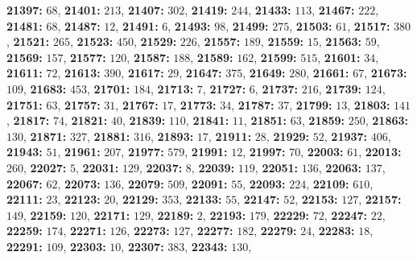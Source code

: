 \textsf{\bfseries 21397:} $68$, \textsf{\bfseries 21401:} $213$, \textsf{\bfseries 21407:} $302$, \textsf{\bfseries 21419:} $244$, \textsf{\bfseries 21433:} $113$, \textsf{\bfseries 21467:} $222$, \textsf{\bfseries 21481:} $68$, \textsf{\bfseries 21487:} $12$, \textsf{\bfseries 21491:} $6$, \textsf{\bfseries 21493:} $98$, \textsf{\bfseries 21499:} $275$, \textsf{\bfseries 21503:} $61$, \textsf{\bfseries 21517:} $380$, \textsf{\bfseries 21521:} $265$, \textsf{\bfseries 21523:} $450$, \textsf{\bfseries 21529:} $226$, \textsf{\bfseries 21557:} $189$, \textsf{\bfseries 21559:} $15$, \textsf{\bfseries 21563:} $59$, \textsf{\bfseries 21569:} $157$, \textsf{\bfseries 21577:} $120$, \textsf{\bfseries 21587:} $188$, \textsf{\bfseries 21589:} $162$, \textsf{\bfseries 21599:} $515$, \textsf{\bfseries 21601:} $34$, \textsf{\bfseries 21611:} $72$, \textsf{\bfseries 21613:} $390$, \textsf{\bfseries 21617:} $29$, \textsf{\bfseries 21647:} $375$, \textsf{\bfseries 21649:} $280$, \textsf{\bfseries 21661:} $67$, \textsf{\bfseries 21673:} $109$, \textsf{\bfseries 21683:} $453$, \textsf{\bfseries 21701:} $184$, \textsf{\bfseries 21713:} $7$, \textsf{\bfseries 21727:} $6$, \textsf{\bfseries 21737:} $216$, \textsf{\bfseries 21739:} $124$, \textsf{\bfseries 21751:} $63$, \textsf{\bfseries 21757:} $31$, \textsf{\bfseries 21767:} $17$, \textsf{\bfseries 21773:} $34$, \textsf{\bfseries 21787:} $37$, \textsf{\bfseries 21799:} $13$, \textsf{\bfseries 21803:} $141$, \textsf{\bfseries 21817:} $74$, \textsf{\bfseries 21821:} $40$, \textsf{\bfseries 21839:} $110$, \textsf{\bfseries 21841:} $11$, \textsf{\bfseries 21851:} $63$, \textsf{\bfseries 21859:} $250$, \textsf{\bfseries 21863:} $130$, \textsf{\bfseries 21871:} $327$, \textsf{\bfseries 21881:} $316$, \textsf{\bfseries 21893:} $17$, \textsf{\bfseries 21911:} $28$, \textsf{\bfseries 21929:} $52$, \textsf{\bfseries 21937:} $406$, \textsf{\bfseries 21943:} $51$, \textsf{\bfseries 21961:} $207$, \textsf{\bfseries 21977:} $579$, \textsf{\bfseries 21991:} $12$, \textsf{\bfseries 21997:} $70$, \textsf{\bfseries 22003:} $61$, \textsf{\bfseries 22013:} $260$, \textsf{\bfseries 22027:} $5$, \textsf{\bfseries 22031:} $129$, \textsf{\bfseries 22037:} $8$, \textsf{\bfseries 22039:} $119$, \textsf{\bfseries 22051:} $136$, \textsf{\bfseries 22063:} $137$, \textsf{\bfseries 22067:} $62$, \textsf{\bfseries 22073:} $136$, \textsf{\bfseries 22079:} $509$, \textsf{\bfseries 22091:} $55$, \textsf{\bfseries 22093:} $224$, \textsf{\bfseries 22109:} $610$, \textsf{\bfseries 22111:} $23$, \textsf{\bfseries 22123:} $20$, \textsf{\bfseries 22129:} $353$, \textsf{\bfseries 22133:} $55$, \textsf{\bfseries 22147:} $52$, \textsf{\bfseries 22153:} $127$, \textsf{\bfseries 22157:} $149$, \textsf{\bfseries 22159:} $120$, \textsf{\bfseries 22171:} $129$, \textsf{\bfseries 22189:} $2$, \textsf{\bfseries 22193:} $179$, \textsf{\bfseries 22229:} $72$, \textsf{\bfseries 22247:} $22$, \textsf{\bfseries 22259:} $174$, \textsf{\bfseries 22271:} $126$, \textsf{\bfseries 22273:} $127$, \textsf{\bfseries 22277:} $182$, \textsf{\bfseries 22279:} $24$, \textsf{\bfseries 22283:} $18$, \textsf{\bfseries 22291:} $109$, \textsf{\bfseries 22303:} $10$, \textsf{\bfseries 22307:} $383$, \textsf{\bfseries 22343:} $130$, 
